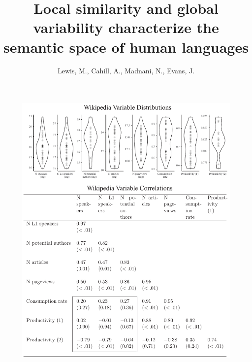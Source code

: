\documentclass[9pt,twoside,lineno]{pnas-new}
\title{Local similarity and global variability characterize the semantic space of human languages}
\author{Lewis, M., Cahill, A., Madnani, N., Evans, J.}
\begin{document}

\maketitle



\begin{figure}
\centering
\includegraphics[width = 5.2in]{suppfigs/wiki_distribution_correlation.pdf}



\end{figure}
\end{document}
